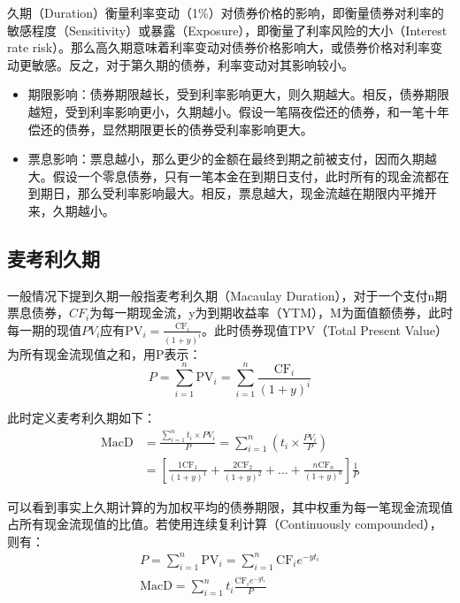 \documentclass[11pt]{article}
\begin{document}
久期（Duration）衡量利率变动（1\%）对债券价格的影响，即衡量债券对利率的敏感程度（Sensitivity）或暴露（Exposure），即衡量了利率风险的大小（Interest rate risk）。那么高久期意味着利率变动对债券价格影响大，或债券价格对利率变动更敏感。反之，对于第久期的债券，利率变动对其影响较小。
\begin{itemize}
    \item 期限影响：债券期限越长，受到利率影响更大，则久期越大。相反，债券期限越短，受到利率影响更小，久期越小。假设一笔隔夜偿还的债券，和一笔十年偿还的债券，显然期限更长的债券受利率影响更大。
    \item 票息影响：票息越小，那么更少的金额在最终到期之前被支付，因而久期越大。假设一个零息债券，只有一笔本金在到期日支付，此时所有的现金流都在到期日，那么受利率影响最大。相反，票息越大，现金流越在期限内平摊开来，久期越小。
\end{itemize}

\subsection*{麦考利久期}

一般情况下提到久期一般指麦考利久期（Macaulay Duration），对于一个支付n期票息债券，$CF_i$为每一期现金流，y为到期收益率（YTM），M为面值额债券，此时每一期的现值$PV_i$应有$\text{PV}_i = \frac{\text{CF}_i}{(1+y)^i}$。此时债券现值TPV（Total Present Value）为所有现金流现值之和，用P表示：
\begin{equation*}
    P = \sum_{i=1}^{n} \text{PV}_i = \sum_{i=1}^{n} \frac{\text{CF}_i}{(1+y)^i}
\end{equation*}

此时定义麦考利久期如下：
\begin{align*}
    \text{MacD} &= \frac{\sum_{i=1}^{n} t_i \times PV_i}{P}
    = \sum_{i=1}^{n} \left( t_i \times \frac{PV_i}{P} \right) \\
    &= \left[ \frac{1 \text{CF}_1}{(1+y)^1} + \frac{2\text{CF}_2}{(1+y)^2} + \dots + \frac{n \text{CF}_n}{(1+y)^{n}} \right] \frac{1}{P}
\end{align*}

可以看到事实上久期计算的为加权平均的债券期限，其中权重为每一笔现金流现值占所有现金流现值的比值。若使用连续复利计算（Continuously compounded），则有：
\begin{gather*}
    P = \sum_{i=1}^{n} \text{PV}_i = \sum_{i=1}^{n} \text{CF}_i e^{-y t_i} \\
    \text{MacD} = \sum_{i=1}^{n} t_i \frac{\text{CF}_i e^{-y t_i}}{P}
\end{gather*}
\end{document}
